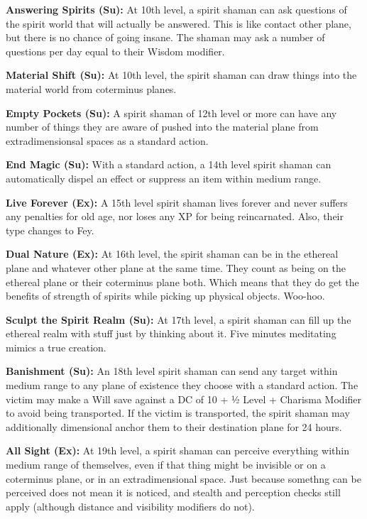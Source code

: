 \textbf{Answering Spirits (Su):} At 10th level, a spirit shaman can ask questions of the spirit world that will actually be answered. This is like contact other plane, but there is no chance of going insane. The shaman may ask a number of questions per day equal to their Wisdom modifier.

\textbf{Material Shift (Su):} At 10th level, the spirit shaman can draw things into the material world from coterminus planes.

\textbf{Empty Pockets (Su):} A spirit shaman of 12th level or more can have any number of things they are aware of pushed into the material plane from extradimensionsal spaces as a standard action.

\textbf{End Magic (Su):} With a standard action, a 14th level spirit shaman can automatically dispel an effect or suppress an item within medium range.

\textbf{Live Forever (Ex):} A 15th level spirit shaman lives forever and never suffers any penalties for old age, nor loses any XP for being reincarnated. Also, their type changes to Fey.

\textbf{Dual Nature (Ex):} At 16th level, the spirit shaman can be in the ethereal plane and whatever other plane at the same time. They count as being on the ethereal plane or their coterminus plane both. Which means that they do get the benefits of strength of spirits while picking up physical objects. Woo-hoo.

\textbf{Sculpt the Spirit Realm (Su):} At 17th level, a spirit shaman can fill up the ethereal realm with stuff just by thinking about it. Five minutes meditating mimics a true creation.

\textbf{Banishment (Su):} An 18th level spirit shaman can send any target within medium range to any plane of existence they choose with a standard action. The victim may make a Will save against a DC of 10 + ½ Level + Charisma Modifier to avoid being transported. If the victim is transported, the spirit shaman may additionally dimensional anchor them to their destination plane for 24 hours.

\textbf{All Sight (Ex):} At 19th level, a spirit shaman can perceive everything within medium range of themselves, even if that thing might be invisible or on a coterminus plane, or in an extradimensional space. Just because somethng can be perceived does not mean it is noticed, and stealth and perception checks still apply (although distance and visibility modifiers do not).
